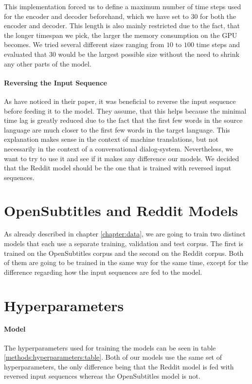 This implementation forced us to define a maximum number of time steps used for the encoder and decoder beforehand, which we have set to $30$ for both the encoder and decoder. This length is also mainly restricted due to the fact, that the longer timespan we pick, the larger the memory consumption on the GPU becomes. We tried several different sizes ranging from $10$ to $100$ time steps and evaluated that $30$ would be the largest possible size without the need to shrink any other parts of the model.

\paragraph{Reversing the Input Sequence} As \cite{Sutskever:2014} have noticed in their paper, it was beneficial to reverse the input sequence before feeding it to the model. They assume, that this helps because the minimal time lag \cite{Hochreiter:1997} is greatly reduced due to the fact that the first few words in the source language are much closer to the first few words in the target language. This explanation makes sense in the context of machine translations, but not necessarily in the context of a conversational dialog-system. Nevertheless, we want to try to use it and see if it makes any difference our models. We decided that the Reddit model should be the one that is trained with reversed input sequences.
\section{OpenSubtitles and Reddit Models}
\label{methods:both_models}
As already described in chapter \ref{chapter:data}, we are going to train two distinct models that each use a separate training, validation and test corpus. The first is trained on the OpenSubtitles corpus and the second on the Reddit corpus. Both of them are going to be trained in the same way for the same time, except for the difference regarding how the input sequences are fed to the model.

\section{Hyperparameters}
\label{methods:hyperparameters}

\paragraph{Model} The hyperparameters used for training the models can be seen in table \ref{methods:hyperparameters:table}. Both of our models use the same set of hyperparameters, the only difference being that the Reddit model is fed with reversed input sequences whereas the OpenSubtitles model is not.

